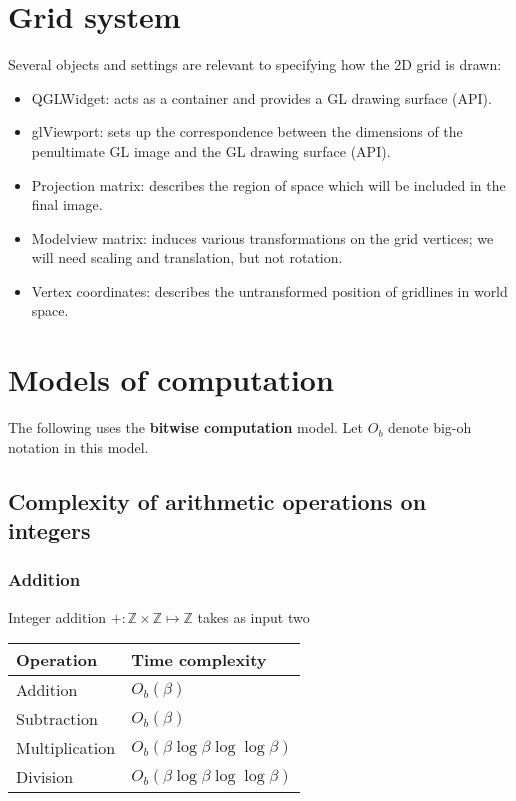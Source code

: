 \documentclass[oneside]{memoir}
\begin{document}
\chapter{Grid system}

Several objects and settings are relevant to specifying how the 2D grid is drawn:

\begin{itemize}
  \item QGLWidget: acts as a container and provides a GL drawing surface (API).
  \item glViewport: sets up the correspondence between the dimensions of the
  penultimate GL image and the GL drawing surface (API).
  \item Projection matrix: describes the region of space which will be included
  in the final image.
  \item Modelview matrix: induces various transformations on the grid vertices;
  we will need scaling and translation, but not rotation.
  \item Vertex coordinates: describes the untransformed position of gridlines in
  world space.
\end{itemize}

\chapter{Models of computation}

The following uses the \textbf{bitwise computation} model. Let $O_b$ denote
big-oh notation in this model.

\section{Complexity of arithmetic operations on integers}

\subsection{Addition}

Integer addition $+ : \mathbb{Z} \times \mathbb{Z} \mapsto \mathbb{Z}$ takes as
input two 



\begin{table}[hr]
\begin{tabularx}{\textwidth}{lX}
\toprule
Operation & Time complexity \\
\midrule
Addition & $O_b(\beta)$ \\
Subtraction & $O_b(\beta)$ \\
Multiplication & $O_b(\beta \log \beta \log \log \beta)$ \\
Division & $O_b(\beta \log \beta \log \log \beta)$ \\ 
\bottomrule
\end{tabularx}
\end{table}
\end{document}
